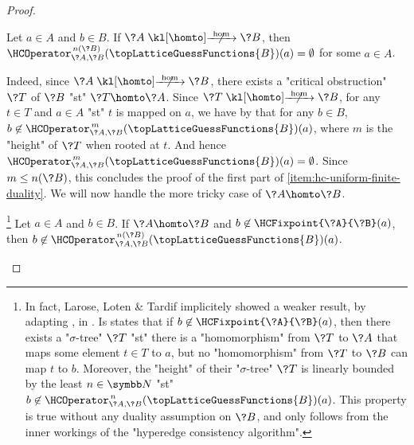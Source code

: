 \begin{proof}
	\begin{claim}%
		\AP\label{claim:hyperedge-consistency-uniform-convergence-no-hom}
		Let $a\in A$ and $b\in B$.
		If $\?A \nothomto \?B$, then $\HCOperator^{\,n(\?B)}_{\?A,\?B}(\topLatticeGuessFunctions{B})(a) = \emptyset$ for some $a \in A$.
	\end{claim}
	Indeed, since $\?A \nothomto \?B$, there exists a "critical obstruction" $\?T$ of $\?B$
	"st" $\?T \homto \?A$. Since $\?T \nothomto \?B$, for any $t \in T$ and $a\in A$
	"st" $t$ is mapped on $a$, we have by  that for any $b\in B$,
	$b \not\in \HCOperator^{\,m}_{\?A,\?B}(\topLatticeGuessFunctions{B})(a)$,
	where $m$ is the "height" of $\?T$ when rooted at $t$.
	And hence $\HCOperator^{\,m}_{\?A,\?B}(\topLatticeGuessFunctions{B})(a) = \emptyset$.
	Since $m \leq n(\?B)$, this concludes the proof of the first part of
	\eqref{item:hc-uniform-finite-duality}. We will now handle the more tricky case of
	$\?A \homto \?B$.
	
	\begin{claim}%
		\!\footnote{In fact, Larose, Loten \& Tardif implicitely showed a weaker result, by adapting
			\cite[Theorem 21]{FederVardi1998ComputationalStructure}, in
			\cite[Proof of Lemma 3.2]{LaroseLotenTardif2007CharacterisationFOCSP}.
			Is states that
			if $b \not\in \HCFixpoint{\?A}{\?B}(a)$, then there
			exists a "$\sigma$-tree" $\?T$ "st" there is a "homomorphism" from $\?T$ to $\?A$
			that maps some element $t \in T$ to $a$, but no "homomorphism" from $\?T$ to $\?B$
			can map $t$ to $b$. Moreover, the "height" of their "$\sigma$-tree" $\?T$ is linearly 
			bounded by the least $n\in \N$ "st"
			$b\not\in \HCOperator^{\,n}_{\?A,\?B}(\topLatticeGuessFunctions{B})(a)$.
			This property is true without any duality assumption on $\?B$, and only follows
			from the inner workings of the "hyperedge consistency algorithm".}%
		\AP\label{claim:hyperedge-consistency-uniform-convergence-hom}
		Let $a\in A$ and $b\in B$.
		If $\?A \homto \?B$ and $b \not\in \HCFixpoint{\?A}{\?B}(a)$,
		then $b \not\in \HCOperator^{\,n(\?B)}_{\?A,\?B}(\topLatticeGuessFunctions{B})(a)$.
	\end{claim}


\end{proof}
